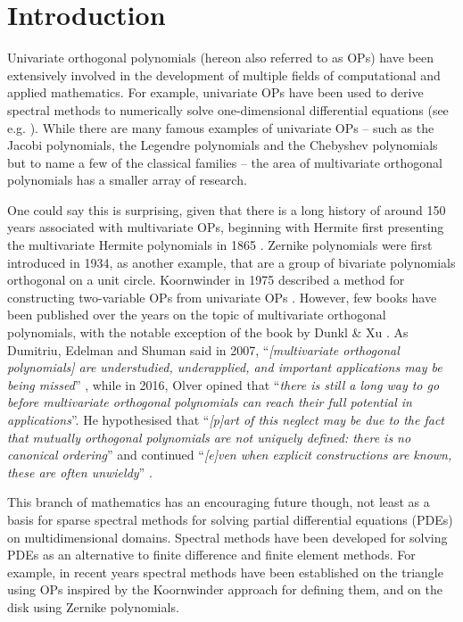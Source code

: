 
\chapter{Introduction}\label{CHAPTER:intro}

Univariate orthogonal polynomials (hereon also referred to as OPs) have been extensively involved in the development of multiple fields of computational and applied mathematics. For example, univariate OPs have been used to derive spectral methods to numerically solve one-dimensional differential equations (see e.g. \cite{trefethen2000spectral, canuto2007spectral, gottlieb1977numerical, boyd2001chebyshev, mason2002chebyshev, shen2011spectral, olver2013fast}). While there are many famous examples of univariate OPs -- such as the Jacobi polynomials, the Legendre polynomials and the Chebyshev polynomials but to name a few of the classical families \cite[\S18.3]{DLMF} -- the area of multivariate orthogonal polynomials has a smaller array of research. 

One could say this is surprising, given that there is a long history of around 150 years associated with multivariate OPs, beginning with Hermite first presenting the multivariate Hermite polynomials in 1865 \cite{appel1926fonctions, ismail2017review}. Zernike polynomials \cite{zernike1934diffraction} were first introduced in 1934, as another example, that are a group of bivariate polynomials orthogonal on a unit circle. Koornwinder in 1975 described a method for constructing two-variable OPs from univariate OPs \cite{koornwinder1975two}. However, few books have been published over the years on the topic of multivariate orthogonal polynomials, with the notable exception of the book by Dunkl \& Xu \cite{dunkl2014orthogonal}. As Dumitriu, Edelman and Shuman said in 2007, \enquote{\textit{[multivariate orthogonal polynomials] are understudied, underapplied, and important applications may be being missed}} \cite{dumitriu2007mops}, while in 2016, Olver opined that \enquote{\textit{there is still a long way to go before multivariate orthogonal polynomials can reach their full potential in applications}}. He hypothesised that \enquote{\textit{[p]art of this neglect may be due to the fact that mutually orthogonal polynomials are not uniquely defined: there is no canonical ordering}} and continued \enquote{\textit{[e]ven when explicit constructions are known, these are often unwieldy}} \cite{olver2016review}.

This branch of mathematics has an encouraging future though, not least as a basis for sparse spectral methods for solving partial differential equations (PDEs) on multidimensional domains. Spectral methods have been developed for solving PDEs as an alternative to finite difference and finite element methods. For example, in recent years spectral methods have been established on the triangle \cite{olver2019triangle} using OPs inspired by the Koornwinder approach for defining them, and on the disk \cite{vasil2016tensor} using Zernike polynomials.


